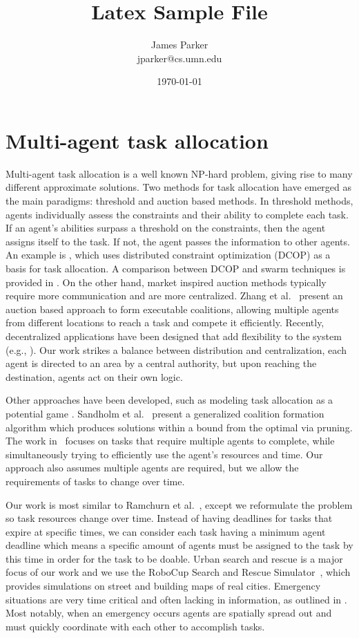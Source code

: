 \documentclass[11pt]{article}
\title{Latex Sample File}
\author{
James Parker\\jparker@cs.umn.edu
}
\date{\today}
\begin{document}
\maketitle

\section{Multi-agent task allocation} 
\label{sec:rw}

Multi-agent task allocation is a well known NP-hard problem,
giving rise to many different approximate solutions.
Two methods for task allocation have emerged 
as the main paradigms: threshold and auction based methods.
In threshold methods, agents individually assess the constraints and their 
ability to complete each task.  If an agent's abilities surpass a threshold 
on the constraints, then the agent assigns itself to the task.  
If not, the agent passes the information to other agents.  
An example is \cite{Scer-Fari-05}, 
which uses distributed constraint optimization (DCOP) as a basis for 
task allocation.
A comparison between DCOP and swarm techniques is provided in 
\cite{Ferreira2010}.  
On the other hand, 
market inspired auction methods typically require more
communication and are more centralized.  
Zhang et al.~\cite{Zhang2012} present an auction based 
approach to form executable coalitions,
allowing multiple agents from different locations 
to reach a task and compete it efficiently.  
Recently, decentralized applications have been designed that add flexibility 
to the system (e.g., \cite{Nanjanath10}).
Our work strikes a balance between distribution and centralization, each agent is
directed to an area by a central authority, but upon reaching the destination,
agents act on their own logic.

Other approaches have been developed, such as 
modeling task allocation as a potential game
\cite{Chapman2010}.
Sandholm et al.~\cite{Sandholm99} present a generalized coalition formation 
algorithm which produces solutions within a bound from the optimal via 
pruning.
The work in~\cite{Zheng08} focuses on tasks that require 
multiple agents to complete,
while simultaneously trying to efficiently use 
the agent's resources and time.
Our approach also assumes multiple agents are required, but we allow
the requirements of tasks to change over time.

Our work is most similar to Ramchurn et al.~\cite{Ramchurn10},
except we reformulate the problem so task resources change over time.
Instead of having deadlines for tasks that expire at specific times,
we can consider each task having a minimum agent deadline which
means a specific amount of agents must be assigned to the task
by this time in order for the task to be doable.
Urban search and rescue is a major focus of our work and we use the
RoboCup Search and Rescue Simulator~\cite{Kitano01}, which provides
simulations on street and building maps of real cities.
Emergency situations are very time critical and often lacking
in information, as outlined in \cite{Monares11}.  
Most notably, when an emergency occurs agents are spatially
spread out and must quickly
coordinate with each other to accomplish tasks.




\end{document}
